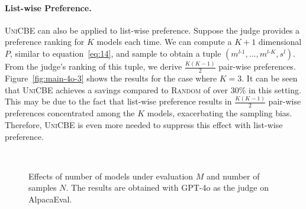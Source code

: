 \paragraph{List-wise Preference.} 
\label{sec:5.4-2}
\textsc{UniCBE} can also be applied to list-wise preference. Suppose the judge provides a preference ranking for $K$ models each time. We can compute a $K+1$ dimensional $P$, similar to equation~\eqref{eq:14}, and sample to obtain a tuple \((m^{l\text{-}1},...,m^{l\text{-}K},s^l)\). From the judge's ranking of this tuple, we derive \(\frac{K(K-1)}{2}\) pair-wise preferences.
Figure~\ref{fig:main-4o-3} shows the results for the case where \(K=3\). It can be seen that \textsc{UniCBE} achieves a savings compared to \textsc{Random} of over 30\% in this setting.
This may be due to the fact that list-wise preference results in \(\frac{K(K-1)}{2}\) pair-wise preferences concentrated among the $K$ models, exacerbating the sampling bias. Therefore, \textsc{UniCBE} is even more needed to suppress this effect with list-wise preference.
%



\begin{figure}[htbp]
    \centering
    \vspace{-0.2cm}
    \hfill
    \hfill
     \\
    \hfill
    \hfill
    \vspace{-0.2cm}
    \caption{Effects of number of models under evaluation $M$ and number of samples $N$. The results are obtained with GPT-4o as the judge on AlpacaEval.}
    \vspace{-0.4cm}
    \label{fig:main-4o-hyper}
\end{figure}

